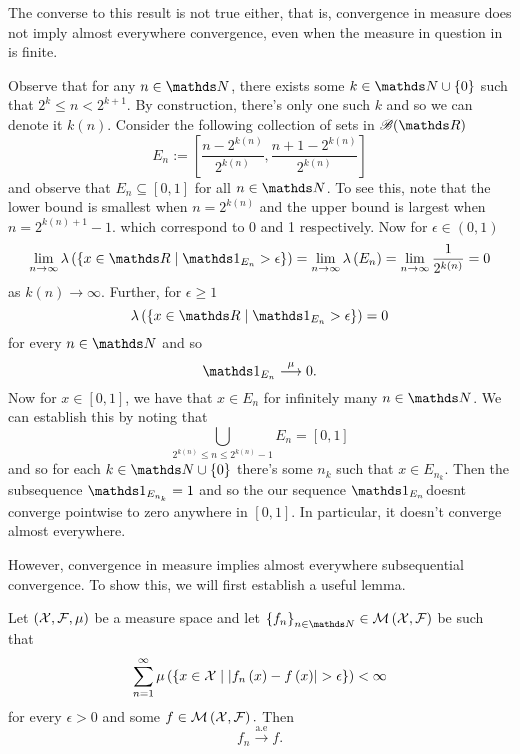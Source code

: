 The converse to this result is not true either, that is, convergence
in measure does not imply almost everywhere convergence, even when
the measure in question in is finite.
\begin{example}
\label{exa:convMeasureDoesntImplyAEConv} Observe that for any $n\in\N$,
there exists some $k\in\N\cup\{0\}$ such that $2^{k}\leq n<2^{k+1}.$
By construction, there's only one such $k$ and so we can denote it
$k(n).$ Consider the following collection of sets in $\borel(\R)$
\[
E_{n}:=\left[\frac{n-2^{k(n)}}{2^{k(n)}},\frac{n+1-2^{k(n)}}{2^{k(n)}}\right]
\]
and observe that $E_{n}\subseteq[0,1]$ for all $n\in\N$. To see
this, note that the lower bound is smallest when $n=2^{k(n)}$ and
the upper bound is largest when $n=2^{k(n)+1}-1$. which correspond
to 0 and 1 respectively. Now for $\epsilon\in(0,1)$
\[
\lim_{n\to\infty}\lambda\left(\left\{ x\in\R\mid\indicate_{E_{n}}>\epsilon\right\} \right)=\lim_{n\to\infty}\lambda\left(E_{n}\right)=\lim_{n\to\infty}\frac{1}{2^{k(n)}}=0
\]
as $k(n)\to\infty.$ Further, for $\epsilon\geq1$
\[
\lambda\left(\left\{ x\in\R\mid\indicate_{E_{n}}>\epsilon\right\} \right)=0
\]
for every $n\in\N$ and so 
\[
\indicate_{E_{n}}\stackrel{\mu}{\longrightarrow}0.
\]
Now for $x\in[0,1]$, we have that $x\in E_{n}$ for infinitely many
$n\in\N$. We can establish this by noting that 
\[
\bigcup_{2^{k(n)}\leq n\leq2^{k(n)}-1}E_{n}=[0,1]
\]
and so for each $k\in\N\cup\{0\}$ there's some $n_{k}$ such that
$x\in E_{n_{k}}$. Then the subsequence $\indicate_{E_{n_{k}}}=1$
and so the our sequence $\indicate_{E_{n}}$doesnt converge pointwise
to zero anywhere in $[0,1].$ In particular, it doesn't converge almost
everywhere.
\end{example}

However, convergence in measure implies almost everywhere subsequential
convergence. To show this, we will first establish a useful lemma.
\begin{lem}
\label{lem:borelCantelliAEConvArgument}Let $\left(\mathcal{X},\mathcal{F},\mu\right)$
be a measure space and let $\left\{ f_{n}\right\} _{n\in\N}\in\measurableFunctions$
be such that 
\[
\sum_{n=1}^{\infty}\mu\left(\left\{ x\in\mathcal{X}\mid\lvert f_{n}\left(x\right)-f\left(x\right)\rvert>\epsilon\right\} \right)<\infty
\]
for every $\epsilon>0$ and some $f\in\mathcal{M}\left(\mathcal{X},\mathcal{F}\right).$ Then
\[
f_{n}\stackrel{\text{a.e}}{\longrightarrow}f.
\]
\end{lem}

